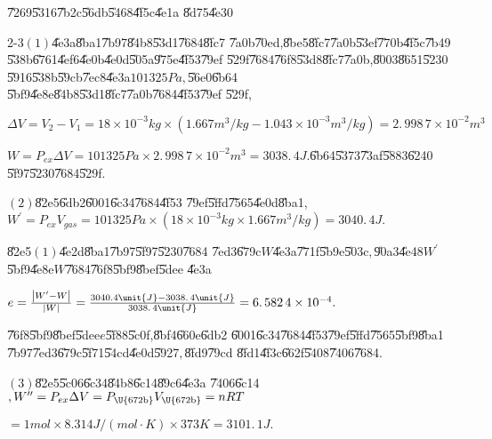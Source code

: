 \documentclass{article}
\begin{document}
\bigskip \U{7269}\U{5316}\U{7b2c}\U{56db}\U{5468}\U{4f5c}\U{4e1a}\qquad 
\U{8d75}\U{4e30}

2-3$\left( 1\right) $\U{4e3a}\U{8ba1}\U{7b97}\U{84b8}\U{53d1}\U{7684}\U{8fc7}%
\U{7a0b}\U{70ed},\U{8be5}\U{8fc7}\U{7a0b}\U{53ef}\U{770b}\U{4f5c}\U{7b49}%
\U{538b}\U{6761}\U{4ef6}\U{4e0b}\U{4e0d}\U{505a}\U{975e}\U{4f53}\U{79ef}%
\U{529f}\U{7684}\U{76f8}\U{53d8}\U{8fc7}\U{7a0b},\U{8003}\U{8651}\U{5230}%
\U{5916}\U{538b}\U{59cb}\U{7ec8}\U{4e3a}$101325\unit{Pa},$\U{56e0}\U{6b64}%
\U{5bf9}\U{4e8e}\U{84b8}\U{53d1}\U{8fc7}\U{7a0b}\U{7684}\U{4f53}\U{79ef}%
\U{529f},

$\Delta V=V_{2}-V_{1}=18\times 10^{-3}\unit{kg}\times (1.667\unit{m}^{3}/%
\unit{kg}-1.043\times 10^{-3}\unit{m}^{3}/\unit{kg})=\allowbreak
2.\,\allowbreak 998\,7\times 10^{-2}\unit{m}^{3}$

$W=P_{ex}\Delta V=101325\unit{Pa}\times \allowbreak \allowbreak
2.\,\allowbreak 998\,7\times 10^{-2}\unit{m}^{3}=\allowbreak
3038.\,\allowbreak 4\unit{J}.$\U{6b64}\U{5373}\U{73af}\U{5883}\U{6240}%
\U{5f97}\U{5230}\U{7684}\U{529f}.

\bigskip $\left( 2\right) $\U{82e5}\U{6db2}\U{6001}\U{6c34}\U{7684}\U{4f53}%
\U{79ef}\U{5ffd}\U{7565}\U{4e0d}\U{8ba1},$W^{\prime }=P_{ex}V_{gas}=101325%
\unit{Pa}\times (\allowbreak 18\times 10^{-3}\unit{kg}\times 1.667\unit{m}%
^{3}/\unit{kg})=\allowbreak 3040.\,\allowbreak 4\unit{J}.$

\U{82e5}$\left( 1\right) $\U{4e2d}\U{8ba1}\U{7b97}\U{5f97}\U{5230}\U{7684}%
\U{7ed3}\U{679c}$W$\U{4e3a}\U{771f}\U{5b9e}\U{503c}$,$\U{90a3}\U{4e48}$%
W^{\prime }$\U{5bf9}\U{4e8e}$W$\U{7684}\U{76f8}\U{5bf9}\U{8bef}\U{5dee}%
\U{4e3a}\qquad

$e=\frac{\left\vert W^{\prime }-W\right\vert }{\left\vert W\right\vert }=%
\frac{\allowbreak 3040.4\unit{J}-\allowbreak 3038.\,\allowbreak 4\unit{J}}{%
\allowbreak 3038.\,\allowbreak 4\unit{J}}=\allowbreak 6.\,\allowbreak
582\,4\times 10^{-4}.$

\U{76f8}\U{5bf9}\U{8bef}\U{5dee}$e$\U{5f88}\U{5c0f},\U{8bf4}\U{660e}\U{6db2}%
\U{6001}\U{6c34}\U{7684}\U{4f53}\U{79ef}\U{5ffd}\U{7565}\U{5bf9}\U{8ba1}%
\U{7b97}\U{7ed3}\U{679c}\U{5f71}\U{54cd}\U{4e0d}\U{5927}$,$\U{8fd9}\U{79cd}%
\U{8fd1}\U{4f3c}\U{662f}\U{5408}\U{7406}\U{7684}.

$\left( 3\right) $\U{82e5}\U{5c06}\U{6c34}\U{84b8}\U{6c14}\U{89c6}\U{4e3a}%
\U{7406}\U{6c14}$,W^{\prime \prime }=P_{ex}\Delta V=P_{\text{\U{672b}}}V_{%
\text{\U{672b}}}=nRT$

$=1\unit{mol}\times 8.314\unit{J}/\left( \unit{mol}\cdot \unit{K}\right)
\times 373\unit{K}=\allowbreak 3101.\,\allowbreak 1\unit{J}.$
\end{document}
